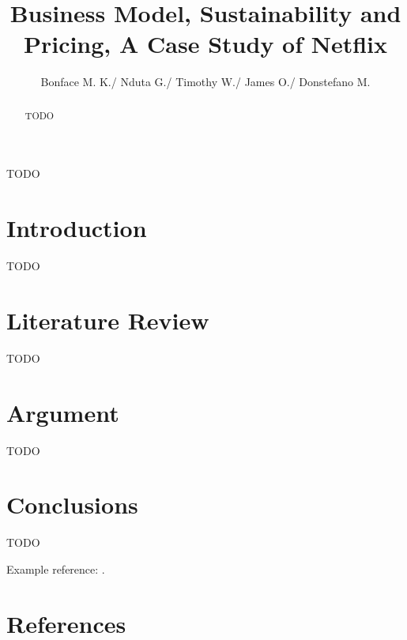 \documentclass[review]{elsarticle}
\begin{document}
\begin{frontmatter}

\title{Business Model, Sustainability and Pricing, A Case Study of Netflix}

\author{Bonface M. K./ Nduta G./ Timothy W./ James O./ Donstefano M.}

\begin{abstract}
TODO
\end{abstract}

\begin{keyword}
TODO
\end{keyword}

\end{frontmatter}

\linenumbers

\section{Introduction}

TODO

\section{Literature Review}

TODO


\section{Argument}

TODO

\section{Conclusions}

TODO

Example reference: \cite{Feynman1963118,Dirac1953888}.

\section*{References}


\end{document}

